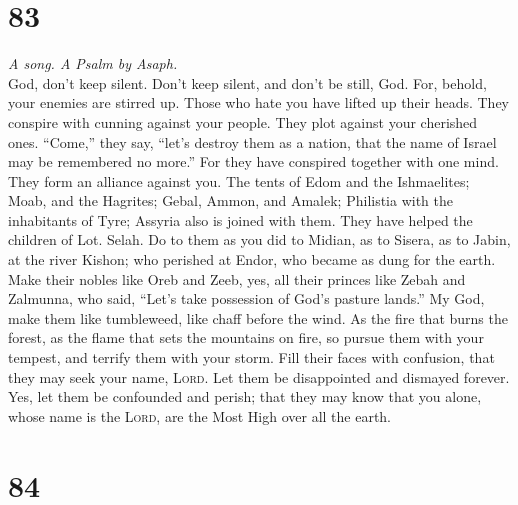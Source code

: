 \hypertarget{section-82}{%
\section{83}\label{section-82}}

\emph{A song. A Psalm by Asaph.}\\
 God, don't keep silent. Don't keep silent, and don't be
still, God.  For, behold, your enemies are stirred up.
Those who hate you have lifted up their heads.  They
conspire with cunning against your people. They plot against your
cherished ones.  ``Come,'' they say, ``let's destroy them
as a nation, that the name of Israel may be remembered no more.''
 For they have conspired together with one mind. They form
an alliance against you.  The tents of Edom and the
Ishmaelites; Moab, and the Hagrites;  Gebal, Ammon, and
Amalek; Philistia with the inhabitants of Tyre;  Assyria
also is joined with them. They have helped the children of Lot. Selah.
 Do to them as you did to Midian, as to Sisera, as to
Jabin, at the river Kishon;  who perished at Endor, who
became as dung for the earth.  Make their nobles like
Oreb and Zeeb, yes, all their princes like Zebah and Zalmunna,
 who said, ``Let's take possession of God's pasture
lands.''  My God, make them like tumbleweed, like chaff
before the wind.  As the fire that burns the forest, as
the flame that sets the mountains on fire,  so pursue
them with your tempest, and terrify them with your storm.
 Fill their faces with confusion, that they may seek your
name, \textsc{Lord}.  Let them be disappointed and
dismayed forever. Yes, let them be confounded and perish;
 that they may know that you alone, whose name is the
\textsc{Lord}, are the Most High over all the earth.

\hypertarget{section-83}{%
\section{84}\label{section-83}}

